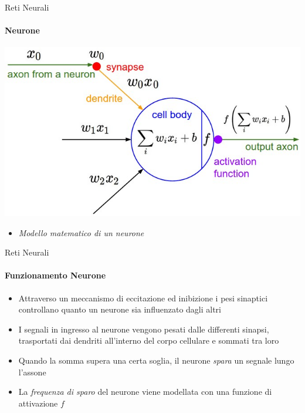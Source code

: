 \documentclass[
 ]{beamer}
\begin{document}
\begin{frame}{Reti Neurali}
    \framesubtitle{Neurone}
    
    \begin{center}
      \includegraphics[scale = 0.35]{neuron_model.jpeg}
    \end{center}
  
    \bigskip 
  
  \begin{itemize}
    \setlength\itemsep{1em}
    \item[] \large \emph{Modello matematico di un neurone}
  \end{itemize}       
\end{frame} 


\begin{frame}{Reti Neurali}
    \framesubtitle{Funzionamento Neurone}
    \begin{itemize} [<+->]
        \setlength\itemsep{2em}
        \item \large Attraverso un meccanismo di eccitazione ed inibizione i pesi sinaptici controllano quanto un neurone sia influenzato dagli altri
       \item \large I segnali in ingresso al neurone vengono pesati dalle differenti sinapsi, trasportati dai dendriti all'interno del corpo cellulare e sommati tra loro
       \item \large Quando la somma supera una certa soglia, il neurone \emph{spara} un segnale lungo l'assone 
       \item \large La \emph{frequenza di sparo} del neurone viene modellata con una funzione di attivazione $f$       
    \end{itemize}
\end{frame}
\end{document}
